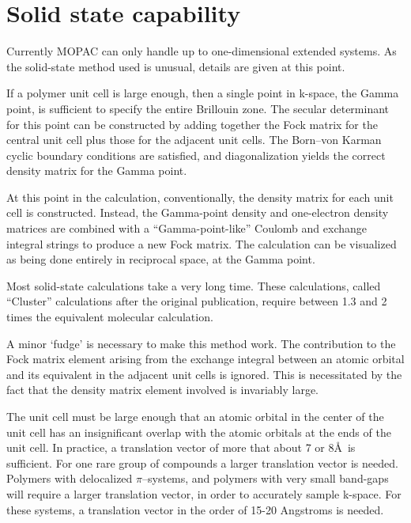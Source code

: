 \documentclass[a4paper]{book}
\newcommand{\mi}[1]{#1\index{#1}}
\begin{document}
\section{Solid state capability}
   Currently MOPAC can only  handle  up  to  one-dimensional  extended
   systems.   As  the solid-state method used is unusual, details are given
   at this point.

        If a polymer unit cell is large enough,  then  a  single  point  in
   k-space,  the Gamma point, is sufficient to specify the entire Brillouin
   zone.  The secular determinant for this  point  can  be  constructed  by
   adding together the Fock matrix for the central unit cell plus those for
   the adjacent unit cells.  The \mi{Born--von Karman} cyclic boundary conditions
   are satisfied, and diagonalization yields the correct density matrix for
   the Gamma point.

        At this point  in  the  calculation,  conventionally,  the  density
   matrix  for  each  unit  cell  is constructed.  Instead, the Gamma-point
   density  and  one-electron  density  matrices  are   combined   with   a
   ``Gamma-point-like'' Coulomb  and  exchange integral strings to produce a
   new Fock matrix.  The  calculation  can  be  visualized  as  being  done
   entirely in reciprocal space, at the Gamma point.

        Most  solid-state  calculations  take  a  very  long  time.   These
   calculations,   called ``Cluster'' calculations   after  the  original
   publication, require between 1.3 and 2 times  the  equivalent  molecular
   calculation.

        A minor `fudge'  is  necessary  to  make  this  method  work.   The
   contribution  to  the  Fock  matrix  element  arising  from the exchange
   integral between an atomic orbital and its equivalent  in  the  adjacent
   unit  cells  is  ignored.   This  is  necessitated  by the fact that the
   density matrix element involved is invariably large.

        The unit cell must be large enough that an atomic  orbital  in  the
   center  of  the  unit  cell has an insignificant overlap with the atomic
   orbitals at the ends of the  unit  cell.   In  practice,  a  translation
   vector  of more that about 7 or 8\AA\ is sufficient.  For one rare
   group of compounds a larger translation vector is needed.  Polymers with
   delocalized  $\pi$--systems,  and  polymers  with  very small band-gaps will
   require a larger translation  vector,  in  order  to  accurately  sample
   k-space.   For these systems, a translation vector in the order of 
   15-20 Angstroms is needed.
\end{document}
